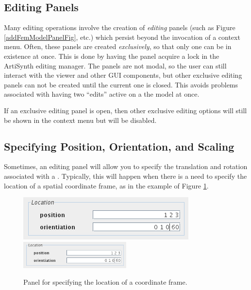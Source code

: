 \documentclass{article}
\begin{document}
\subsection{Editing Panels}

Many editing operations involve the creation of {\it editing} panels (such
as Figure \ref{addFemModelPanelFig}, etc.) which persist beyond the invocation of
a context menu. Often, these panels are created {\it exclusively}, so that
only one can be in existence at once.  This is done by having the
panel acquire a lock in the ArtiSynth editing manager. The panels are
not modal, so the user can still interact with the viewer and other
GUI components, but other exclusive editing panels can not be created
until the current one is closed. This avoids problems associated with
having two ``edits'' active on a the model at once. 

If an exclusive editing panel is open, then other exclusive editing
options will still be shown in the context menu but will be disabled.

\subsection{Specifying Position, Orientation, and Scaling}
\label{positionOrientationScalingSec}

Sometimes, an editing panel will allow you to specify the translation
and rotation associated with a
. Typically, this will happen
when there is a need to specify the location of a spatial coordinate
frame, as in the example of Figure \ref{locationPanelFig}. 

\begin{figure}
\begin{center}
\iflatexml
\includegraphics[]{images/locationPanel}
\else
\includegraphics[width=0.50\textwidth]{images/locationPanel}
\fi
\end{center}
\caption{Panel for specifying the location of a coordinate frame.}%
\label{locationPanelFig}
\end{figure}
\end{document}
